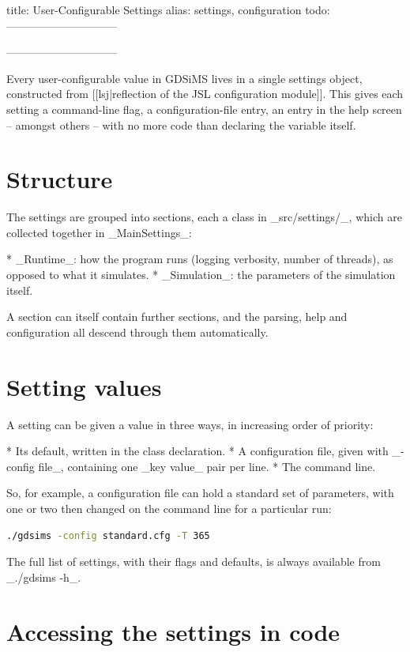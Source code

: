 title: User-Configurable Settings
alias: settings, configuration
todo:
------------------------------
\usepackage{listings}
------------------------------

Every user-configurable value in GDSiMS lives in a single settings object, constructed from [[lsj|reflection of the JSL configuration module]]. This gives each setting a command-line flag, a configuration-file entry, an entry in the help screen -- amongst others -- with no more code than declaring the variable itself.

\section{Structure}

	The settings are grouped into sections, each a class in _src/settings/_, which are collected together in _MainSettings_:

	* _Runtime_: how the program runs (logging verbosity, number of threads), as opposed to what it simulates.
	* _Simulation_: the parameters of the simulation itself.

	A section can itself contain further sections, and the parsing, help and configuration all descend through them automatically.

\section{Setting values}

	A setting can be given a value in three ways, in increasing order of priority:

	* Its default, written in the class declaration.
	* A configuration file, given with _-config file_, containing one _key value_ pair per line.
	* The command line.

	So, for example, a configuration file can hold a standard set of parameters, with one or two then changed on the command line for a particular run:

	\begin{lstlisting}[language=bash]
./gdsims -config standard.cfg -T 365
\end{lstlisting}

	The full list of settings, with their flags and defaults, is always available from _./gdsims -h_.

\section{Accessing the settings in code}

